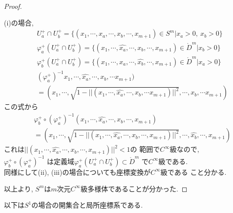 \documentclass[a4j,12pt]{jarticle}
\theoremstyle{definition}
\begin{document}
\begin{proof}
\begin{itemize}
        (i)の場合, 
        \begin{eqnarray*}
            &&U_a^+\cap U_b^+ =\{(x_1,\cdots ,x_a,\cdots ,x_b,\cdots ,x_{m+1})\in S^m|x_a>0,\ x_b>0\}\\
            &&\varphi_a^+(U_a^+\cap U_b^+) =\{(x_1,\cdots ,\hat{x_a},\cdots ,x_b,\cdots ,x_{m+1})\in \mathring{D}^m|x_b>0\}\\
            &&\varphi_b^+(U_a^+\cap U_b^+) =\{(x_1,\cdots ,x_a,\cdots ,\hat{x_b},\cdots ,x_{m+1})\in \mathring{D}^m|x_a>0\}\\
            &&(\varphi_a^+)^{-1}x_1,\cdots ,\hat{x_a},\cdots ,x_b,\cdots x_{m+1})\\
            &&=(x_1,\cdots ,\sqrt{1-||(x_1,\cdots ,\hat{x_a},\cdots ,x_b,\cdots x_{m+1})||^2},\cdots ,x_b,\cdots x_{m+1})
        \end{eqnarray*}
        この式から
        \begin{eqnarray*}
        &&\varphi_b^+\circ(\varphi_a^+)^{-1}(x_1,\cdots ,\hat{x_a},\cdots ,x_b,\cdots ,x_{m+1})\\
        &&=(x_1,\cdots ,\sqrt{1-||(x_1,\cdots ,\hat{x_a},\cdots ,x_b,\cdots ,x_{m+1})||^2},\cdots ,\hat{x_b},\cdots ,x_{m+1})
        \end{eqnarray*}
        これは$||(x_1,\cdots ,\hat{x_a},\cdots ,x_b,\cdots ,x_{m+1})||^2<1$の
        範囲で$C^{\infty}$級なので, \\$\varphi_b^+\circ(\varphi_a^+)^{-1}$
        は定義域$\varphi_a^+(U_a^+\cap U_b^+)\subset \mathring{D}^m$
        で$C^{\infty}$級である. \\
        同様にして(ii), (iii)の場合についても座標変換が$C^{\infty}$級である
        こと分かる. \\
    \end{itemize}
    以上より, $S^m$は$m$次元$C^{\infty}$級多様体であることが分かった. 
\end{proof}
以下は$S^1$の場合の開集合と局所座標系である. 
\end{document}
